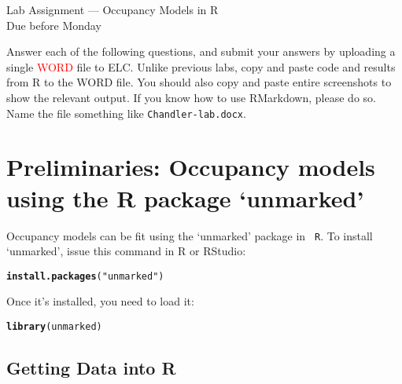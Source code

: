 \documentclass[12pt]{article}\usepackage[]{graphicx}\usepackage[]{color}
\makeatletter
\newcommand{\hlstr}[1]{\textcolor[rgb]{0.192,0.494,0.8}{#1}}%
\newcommand{\hlstd}[1]{\textcolor[rgb]{0.345,0.345,0.345}{#1}}%
\newcommand{\hlkwd}[1]{\textcolor[rgb]{0.737,0.353,0.396}{\textbf{#1}}}%
\newenvironment{kframe}{%
 \def\at@end@of@kframe{}%
 \ifinner\ifhmode%
  \def\at@end@of@kframe{\end{minipage}}%
  \begin{minipage}{\columnwidth}%
 \fi\fi%
 \def\FrameCommand##1{\hskip\@totalleftmargin \hskip-\fboxsep
 \colorbox{shadecolor}{##1}\hskip-\fboxsep
     \hskip-\linewidth \hskip-\@totalleftmargin \hskip\columnwidth}%
 \MakeFramed {\advance\hsize-\width
   \@totalleftmargin\z@ \linewidth\hsize
   \@setminipage}}%
 {\par\unskip\endMakeFramed%
 \at@end@of@kframe}
\newenvironment{knitrout}{}{} %
\makeatother
\begin{document}
{
  \Large
  \centering
  Lab Assignment --- Occupancy Models in R \\
  Due before Monday \par
}

\vspace{10pt}


Answer each of the following questions, and submit your answers by 
uploading a single \textcolor{red}{WORD} file to ELC. Unlike previous labs,
copy and paste code and results from R to the WORD file. You should
also copy and paste entire screenshots to show the relevant output. If
you know how to use RMarkdown, please do so. Name the file something
like \texttt{Chandler-lab.docx}.




\section*{\normalsize Preliminaries: Occupancy models using the R
package `unmarked'}


Occupancy models can be fit using the `unmarked' package in {\tt
R}. To install `unmarked', issue this command in R or RStudio: 

\begin{knitrout}
\color{fgcolor}\begin{kframe}
\begin{alltt}
\hlkwd{install.packages}\hlstd{(}\hlstr{"unmarked"}\hlstd{)}
\end{alltt}
\end{kframe}
\end{knitrout}

Once it's installed, you need to load it:

\begin{knitrout}
\color{fgcolor}\begin{kframe}
\begin{alltt}
\hlkwd{library}\hlstd{(unmarked)}
\end{alltt}
\end{kframe}
\end{knitrout}



\subsection*{\normalsize Getting Data into R}
\vspace{-10pt}
\end{document}
